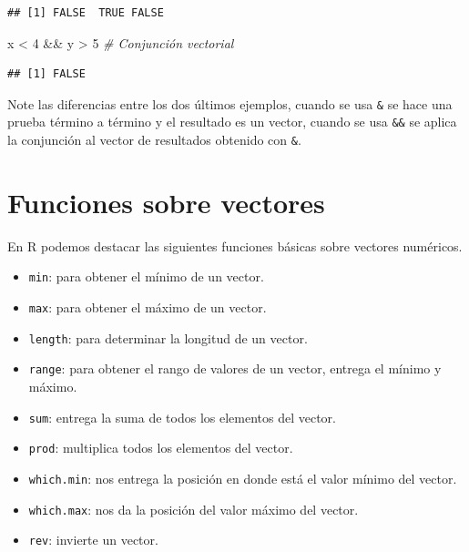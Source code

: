 \documentclass[10pt,]{krantz}
\makeatletter
\newenvironment{Shaded}{\begin{snugshade}}{\end{snugshade}}
\newcommand{\DecValTok}[1]{\textcolor[rgb]{0.00,0.00,0.81}{{#1}}}
\newcommand{\StringTok}[1]{\textcolor[rgb]{0.31,0.60,0.02}{{#1}}}
\newcommand{\CommentTok}[1]{\textcolor[rgb]{0.56,0.35,0.01}{\textit{{#1}}}}
\newcommand{\NormalTok}[1]{{#1}}
\providecommand{\tightlist}{%
  \setlength{\itemsep}{0pt}\setlength{\parskip}{0pt}}
\let\proglang=\textsf
\newenvironment{kframe}{%
\medskip{}
\setlength{\fboxsep}{.8em}
 \def\at@end@of@kframe{}%
 \ifinner\ifhmode%
  \def\at@end@of@kframe{\end{minipage}}%
  \begin{minipage}{\columnwidth}%
 \fi\fi%
 \def\FrameCommand##1{\hskip\@totalleftmargin \hskip-\fboxsep
 \colorbox{shadecolor}{##1}\hskip-\fboxsep
     \hskip-\linewidth \hskip-\@totalleftmargin \hskip\columnwidth}%
 \MakeFramed {\advance\hsize-\width
   \@totalleftmargin\z@ \linewidth\hsize
   \@setminipage}}%
 {\par\unskip\endMakeFramed%
 \at@end@of@kframe}
\renewenvironment{Shaded}{\begin{kframe}}{\end{kframe}}
\makeatother
\begin{document}
\begin{verbatim}
## [1] FALSE  TRUE FALSE
\end{verbatim}

\begin{Shaded}
\begin{Highlighting}[]
\NormalTok{x <}\StringTok{ }\DecValTok{4} \NormalTok{&&}\StringTok{ }\NormalTok{y >}\StringTok{ }\DecValTok{5}  \CommentTok{# Conjunción vectorial}
\end{Highlighting}
\end{Shaded}

\begin{verbatim}
## [1] FALSE
\end{verbatim}

Note las diferencias entre los dos últimos ejemplos, cuando se usa
\texttt{\&} se hace una prueba término a término y el resultado es un
vector, cuando se usa \texttt{\&\&} se aplica la conjunción al vector de
resultados obtenido con \texttt{\&}.

\section{Funciones sobre vectores}\label{funciones-sobre-vectores}

En \proglang{R} podemos destacar las siguientes funciones básicas sobre
vectores numéricos.

    
  

\begin{itemize}
\tightlist
\item
  \texttt{min}: para obtener el mínimo de un vector.
\item
  \texttt{max}: para obtener el máximo de un vector.
\item
  \texttt{length}: para determinar la longitud de un vector.
\item
  \texttt{range}: para obtener el rango de valores de un vector, entrega
  el mínimo y máximo.
\item
  \texttt{sum}: entrega la suma de todos los elementos del vector.
\item
  \texttt{prod}: multiplica todos los elementos del vector.
\item
  \texttt{which.min}: nos entrega la posición en donde está el valor
  mínimo del vector.
\item
  \texttt{which.max}: nos da la posición del valor máximo del vector.
\item
  \texttt{rev}: invierte un vector.
\end{itemize}
\end{document}
